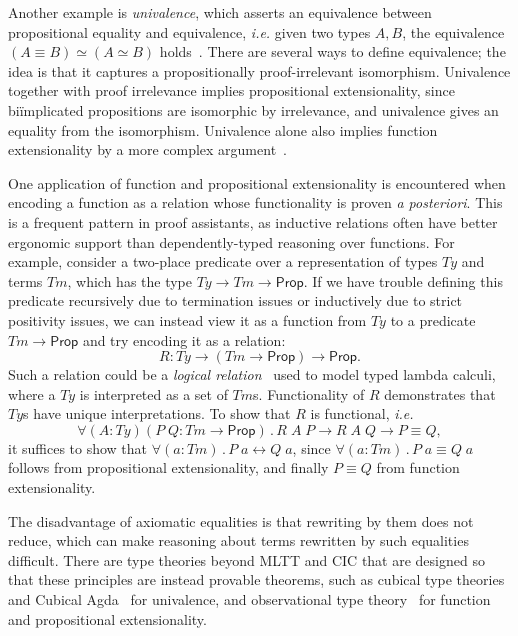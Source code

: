 \documentclass{article}
\makeatletter
\newcommand{\ie}{\textit{i.e.}\@\xspace}
\newcommand{\apost}{\textit{a posteriori}\@\xspace}
\newcommand{\kw}[1]{\mathsf{#1}}
\makeatother
\begin{document}
Another example is \emph{univalence},
which asserts an equivalence between propositional equality and equivalence,
\ie given two types $A, B$,
the equivalence $(A \equiv B) \simeq (A \simeq B)$ holds~\citep{hott}.
There are several ways to define equivalence;
the idea is that it captures a propositionally proof-irrelevant isomorphism.
Univalence together with proof irrelevance implies propositional extensionality,
since bi\"implicated propositions are isomorphic by irrelevance,
and univalence gives an equality from the isomorphism.
Univalence alone also implies function extensionality
by a more complex argument~\cite[Chapter 4.9]{hott}.

One application of function and propositional extensionality
is encountered when encoding a function as a relation
whose functionality is proven \apost.
This is a frequent pattern in proof assistants,
as inductive relations often have better ergonomic support
than dependently-typed reasoning over functions.
For example, consider a two-place predicate over
a representation of types $\mathit{Ty}$ and terms $\mathit{Tm}$,
which has the type $\mathit{Ty} \to \mathit{Tm} \to \kw{Prop}$.
If we have trouble defining this predicate recursively due to termination issues
or inductively due to strict positivity issues,
we can instead view it as a function from $\mathit{Ty}$
to a predicate $\mathit{Tm} \to \kw{Prop}$ and try encoding it as a relation:
$$R : \mathit{Ty} \to (\mathit{Tm} \to \kw{Prop}) \to \kw{Prop}.$$
Such a relation could be a \emph{logical relation}~\citep{logrel}
used to model typed lambda calculi,
where a $\mathit{Ty}$ is interpreted as a set of $\mathit{Tm}$s.
Functionality of $R$ demonstrates that $\mathit{Ty}$s have unique interpretations.
To show that $R$ is functional, \ie
$$\forall (A : \mathit{Ty}) (P \; Q : \mathit{Tm} \to \kw{Prop}) \mathpunct{.}
  R \; A \; P \to R \; A \; Q \to P \equiv Q,$$
it suffices to show that
$\forall (a : \mathit{Tm})\mathpunct{.} P \; a \leftrightarrow Q \; a$,
since $\forall (a : \mathit{Tm})\mathpunct{.} P \; a \equiv Q \; a$
follows from propositional extensionality,
and finally $P \equiv Q$ from function extensionality.

The disadvantage of axiomatic equalities is that rewriting by them does not reduce,
which can make reasoning about terms rewritten by such equalities difficult.
There are type theories beyond MLTT and CIC that are designed
so that these principles are instead provable theorems,
such as cubical type theories~\citep{bch,cchm,afh,cartesian}
and Cubical Agda~\citep{cubical-agda} for univalence,
and observational type theory~\citep{ott,ott-now,ttobs,ccobs,cicobs}
for function and propositional extensionality.
\end{document}
